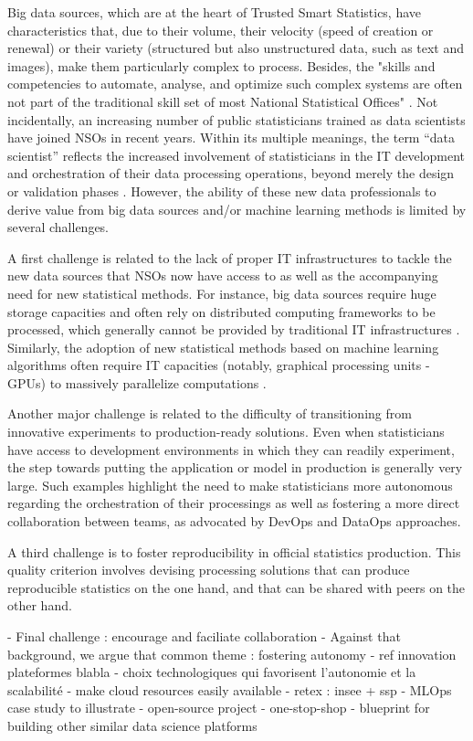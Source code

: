 Big data sources, which are at the heart of Trusted Smart Statistics, have characteristics that, due to their volume, their velocity (speed of creation or renewal) or their variety (structured but also unstructured data, such as text and images), make them particularly complex to process. Besides, the "skills and competencies to automate, analyse, and optimize such complex systems are often not part of the traditional skill set of most National Statistical Offices" \cite{ashofteh2021data}. Not incidentally, an increasing number of public statisticians trained as data scientists have joined NSOs in recent years. Within its multiple meanings, the term “data scientist” reflects the increased involvement of statisticians in the IT development and orchestration of their data processing operations, beyond merely the design or validation phases \cite{davenport2012data}. However, the ability of these new data professionals to derive value from big data sources and/or machine learning methods is limited by several challenges.

A first challenge is related to the lack of proper IT infrastructures to tackle the new data sources that NSOs now have access to as well as the accompanying need for new statistical methods. For instance, big data sources require huge storage capacities and often rely on distributed computing frameworks to be processed, which generally cannot be provided by traditional IT infrastructures \cite{liu2013computing}. Similarly, the adoption of new statistical methods based on machine learning algorithms often require IT capacities (notably, graphical processing units - GPUs) to massively parallelize computations \cite{saiyeda2017cloud}.

Another major challenge is related to the difficulty of transitioning from innovative experiments to production-ready solutions. Even when statisticians have access to development environments in which they can readily experiment, the step towards putting the application or model in production is generally very large. Such examples highlight the need to make statisticians more autonomous regarding the orchestration of their processings as well as fostering a more direct collaboration between teams, as advocated by DevOps and DataOps approaches.

A third challenge is to foster reproducibility in official statistics production. This quality criterion involves devising processing solutions that can produce reproducible statistics on the one hand, and that can be shared with peers on the other hand.

- Final challenge : encourage and faciliate collaboration
- Against that background, we argue that common theme : fostering autonomy
- ref innovation plateformes blabla
- choix technologiques qui favorisent l'autonomie et la scalabilité
- make cloud resources easily available
- retex : insee + ssp
- MLOps case study to illustrate
- open-source project
- one-stop-shop
- blueprint for building other similar data science platforms 